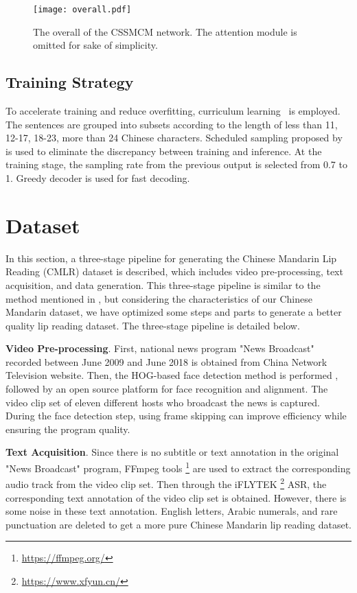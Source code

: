 \documentclass[sigconf]{acmart}
\begin{document}
\begin{figure}
\centering
\texttt{[image: overall.pdf]}
\caption{The overall of the CSSMCM network. The attention module is omitted for sake of simplicity.}\label{fig:overall}
\end{figure}

\subsection{Training Strategy}
To accelerate training and reduce overfitting, curriculum learning~\cite{chung2017lipWild} is employed. The sentences are grouped into subsets according to the length of less than 11, 12-17, 18-23, more than 24 Chinese characters. Scheduled sampling proposed by \cite{bengio2015scheduled} is used to eliminate the discrepancy between training and inference. At the training stage, the sampling rate from the previous output is selected from 0.7 to 1. Greedy decoder is used for fast decoding.


\section{Dataset}
In this section, a three-stage pipeline for generating the Chinese Mandarin Lip Reading (CMLR) dataset is described, which includes video pre-processing, text acquisition, and data generation. This three-stage pipeline is similar to the method mentioned in \cite{chung2017lipWild}, but considering the characteristics of our Chinese Mandarin dataset, we have optimized some steps and parts to generate a better quality lip reading dataset. The three-stage pipeline is detailed below.

\textbf{Video Pre-processing}. 
First, national news program "News Broadcast" recorded between June 2009 and June 2018 is obtained from China Network Television website. Then, the HOG-based face detection method is performed \cite{king2009dlib}, followed by an open source platform for face recognition and alignment. The video clip set of eleven different hosts who broadcast the news is captured. During the face detection step, using frame skipping can improve efficiency while ensuring the program quality.

\textbf{Text Acquisition}. 
Since there is no subtitle or text annotation in the original "News Broadcast" program, FFmpeg tools \footnote{\url{https://ffmpeg.org/}} are used to extract the corresponding audio track from the video clip set. 
Then through the iFLYTEK \footnote{\url{https://www.xfyun.cn/}} ASR, the corresponding text annotation of the video clip set is obtained. However, there is some noise in these text annotation. English letters, Arabic numerals, and rare punctuation are deleted to get a more pure Chinese Mandarin lip reading dataset.
\end{document}

